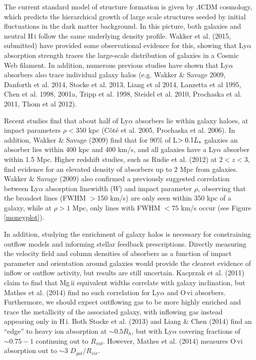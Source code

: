 \documentclass[iop]{emulateapj-rtx4}
\begin{document}
\indent The current standard model of structure formation is given by $\Lambda$CDM cosmology, which predicts the hierarchical growth of large scale structures seeded by initial fluctuations in the dark matter background. In this picture, both galaxies and neutral H\,{\sc i} follow the same underlying density profile. Wakker et al. (2015, submitted) have provided some observational evidence for this, showing that Ly$\alpha$ absorption strength traces the large-scale distribution of galaxies in a Cosmic Web filament. In addition, numerous previous studies have shown that Ly$\alpha$ absorbers also trace individual galaxy halos (e.g. Wakker $\&$ Savage 2009, Danforth et al. 2014, Stocke et al. 2013, Liang et al 2014, Lanzetta et al 1995, Chen et al. 1998, 2001a, Tripp et al. 1998, Steidel et al. 2010, Prochaska et al. 2011, Thom et al 2012). 

Recent studies find that about half of Ly$\alpha$ absorbers lie within galaxy haloes, at impact parameters $\rho<350$ kpc (C\^{o}t\'{e} et al. 2005, Prochaska et al. 2006). In addition, Wakker $\&$ Savage (2009) find that for 90$\%$ of L$>0.1L_{\**}$ galaxies an absorber lies within 400 kpc and 400 km/s, and all galaxies have a Ly$\alpha$ absorber within 1.5 Mpc. Higher redshift studies, such as Rudie et al. (2012) at $2<z<3$, find evidence for an elevated density of absorbers up to 2 Mpc from galaxies. Wakker $\&$ Savage (2009) also confirmed a previously suggested correlation between Ly$\alpha$ absorption linewidth ($W$) and impact parameter $\rho$, observing that the broadest lines (FWHM $>$150 km/s) are only seen within 350 kpc of a galaxy, while at $\rho>1$ Mpc, only lines with FWHM $<75$ km/s occur (see Figure \ref{moneyplot}).

In addition, studying the enrichment of galaxy halos is necessary for constraining outflow models and informing stellar feedback prescriptions. Directly measuring the velocity field and column densities of absorbers as a function of impact parameter and orientation around galaxies would provide the clearest evidence of inflow or outflow activity, but results are still uncertain. Kacprzak et al. (2011) claim to find that Mg\,{\sc ii} equivalent widths correlate with galaxy inclination, but Mathes et al. (2014) find no such correlation for Ly$\alpha$ and O\,{\sc vi} absorbers. Furthermore, we should expect outflowing gas to be more highly enriched and trace the metallicity of the associated galaxy, with inflowing gas instead appearing only in H\,{\sc i}. Both Stocke et al. (2013) and Liang $\&$ Chen (2014) find an ``edge'' to heavy ion absorption at $\sim0.5R_h$, but with Ly$\alpha$ covering fractions of $\sim0.75-1$ continuing out to $R_{vid}$. However, Mathes et al. (2014) measures O\,{\sc vi} absorption out to $\sim3$ $D_{gal}/R_{vir}$. 
\end{document}
